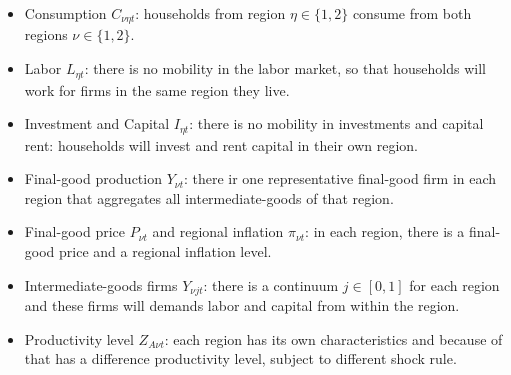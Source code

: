 \documentclass[
	thesis.tex
	]{subfiles}
\begin{document}
\begin{itemize}
	\item Consumption \(C_{\nu\eta t}\): households from region $\eta \in \{1,2\}$ consume from both regions $\nu \in \{1,2\}$.
	
	\item Labor \(L_{\eta t}\): there is no mobility in the labor market, so that households will work for firms in the same region they live.
	
	\item Investment and Capital \(I_{\eta t}\): there is no mobility in investments and capital rent: households will invest and rent capital in their own region.
	
	\item Final-good production \(Y_{\nu t}\): there ir one representative final-good firm in each region that aggregates all intermediate-goods of that region.
	
	\item Final-good price \(P_{\nu t}\) and regional inflation \(\pi_{\nu t}\): in each region, there is a final-good price and a regional inflation level.
	
	\item Intermediate-goods firms \(Y_{\nu jt}\): there is a continuum $j \in [0,1]$ for each region and these firms will demands labor and capital from within the region.
	
	\item Productivity level \(Z_{A\nu t}\): each region has its own characteristics and because of that has a difference productivity level, subject to different shock rule.
	
	\begin{comment}
		
		Determining whether the variable (or parameter) should be region-specific (or not) requires justification:
		
		\item Consumption \(C_{\nu\eta t}\) and \(I_{it}\): Consumption from region to region should vary based on the abundance of natural resources and the available technology in that region: each region will specialize in producing goods that are resource-intensive, considering the resources that are abundant in that specific region. This will increase the supply, decreasing their relative price and making them more demanded. Investment is decided based on the household maximization problem, in which consumption level must be decided regionally.
		
		\item \(\sigma_i\): Consumer preference should be somehow tied to cultural aspects, such as food choices (coastal regions will have a higher emphasis on seafood) or climate characteristics (warmer regions require air conditioning, while colder regions need heaters).
		

\end{comment}
\end{itemize}
\end{document}
